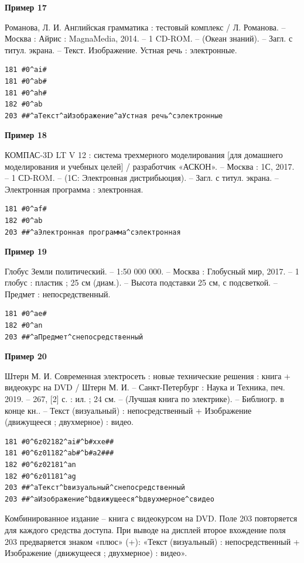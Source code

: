 \textbf{Пример 17}

Романова, Л. И. Английская грамматика : тестовый комплекс / Л. Романова. – Москва : Айрис : MagnaMedia, 2014. – 1 CD-ROM. – (Океан знаний). – Загл. с титул. экрана. – Текст. Изображение. Устная речь : электронные.

\begin{verbatim}
181 #0^ai#
181 #0^ab#
181 #0^ah#
182 #0^ab
203 ##^aТекст^aИзображение^aУстная речь^cэлектронные
\end{verbatim}

\textbf{Пример 18}

КОМПАС-3D LT V 12 : система трехмерного моделирования [для домашнего моделирования и учебных целей] / разработчик «АСКОН». – Москва : 1С, 2017. – 1 СD-ROM. – (1С: Электронная дистрибьюция). – Загл. с титул. экрана. – Электронная программа : электронная.

\begin{verbatim}
181 #0^af#
182 #0^ab
203 ##^aЭлектронная программа^cэлектронная
\end{verbatim}

\textbf{Пример 19}

Глобус Земли политический. – 1:50 000 000. – Москва : Глобусный мир, 2017. – 1 глобус : пластик ; 25 см (диам.). – Высота подставки 25 см, с подсветкой. – Предмет : непосредственный.

\begin{verbatim}
181 #0^ae#
182 #0^an
203 ##^aПредмет^cнепосредственный
\end{verbatim}

\textbf{Пример 20}

Штерн М. И. Современная электросеть : новые технические решения : книга + видеокурс на DVD / Штерн М. И. – Санкт-Петербург : Наука и Техника, печ. 2019. – 267, [2] с. : ил. ; 24 см. – (Лучшая книга по электрике). – Библиогр. в конце кн.. – Текст (визуальный) : непосредственный + Изображение (движущееся ; двухмерное) : видео.

\begin{verbatim}
181 #0^6z02182^ai#^b#xxe##
181 #0^6z01182^ab#^b#a2###
182 #0^6z02181^an
182 #0^6z01181^ag
203 ##^aТекст^bвизуальный^cнепосредственный
203 ##^aИзображение^bдвижущееся^bдвухмерное^cвидео
\end{verbatim}

Комбинированное издание – книга с видеокурсом на DVD. Поле 203 повторяется для каждого средства доступа. При выводе на дисплей второе вхождение поля 203 предваряется знаком «плюс» (+): «Текст (визуальный) : непосредственный + Изображение (движущееся ; двухмерное) : видео».

